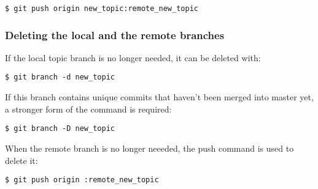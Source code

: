 \documentclass[10p]{article}
\theoremstyle{definition}
\begin{document}
\begin{lstlisting}
$ git push origin new_topic:remote_new_topic
\end{lstlisting}

\subsubsection*{Deleting the local and the remote branches}

If the local topic branch is no longer needed, it can be deleted with:

\begin{lstlisting}
$ git branch -d new_topic
\end{lstlisting}

If this branch contains unique commits that haven't been merged into master yet, a stronger form of the command is required:

\begin{lstlisting}
$ git branch -D new_topic
\end{lstlisting}

When the remote branch is no longer neeeded, the push command is used to delete it:

\begin{lstlisting}
$ git push origin :remote_new_topic
\end{lstlisting}
\end{document}
